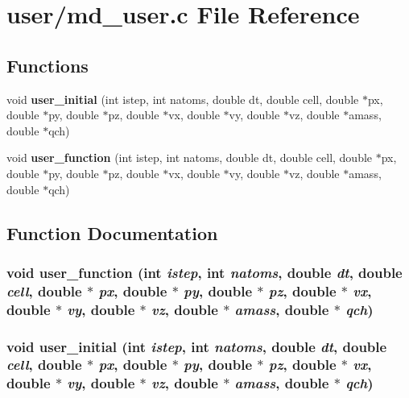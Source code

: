 \section{user/md\_\-user.c File Reference}
\label{md__user_8c}
\subsection*{Functions}
\begin{CompactItemize}
\item 
void {\bf user\_\-initial} (int istep, int natoms, double dt, double cell, double $\ast$px, double $\ast$py, double $\ast$pz, double $\ast$vx, double $\ast$vy, double $\ast$vz, double $\ast$amass, double $\ast$qch)
\item 
void {\bf user\_\-function} (int istep, int natoms, double dt, double cell, double $\ast$px, double $\ast$py, double $\ast$pz, double $\ast$vx, double $\ast$vy, double $\ast$vz, double $\ast$amass, double $\ast$qch)
\end{CompactItemize}


\subsection{Function Documentation}
\subsubsection{\setlength{\rightskip}{0pt plus 5cm}void user\_\-function (int {\em istep}, int {\em natoms}, double {\em dt}, double {\em cell}, double $\ast$ {\em px}, double $\ast$ {\em py}, double $\ast$ {\em pz}, double $\ast$ {\em vx}, double $\ast$ {\em vy}, double $\ast$ {\em vz}, double $\ast$ {\em amass}, double $\ast$ {\em qch})}\label{md__user_8c_a4b4891d9222ff15027095a6acb4e276}


\subsubsection{\setlength{\rightskip}{0pt plus 5cm}void user\_\-initial (int {\em istep}, int {\em natoms}, double {\em dt}, double {\em cell}, double $\ast$ {\em px}, double $\ast$ {\em py}, double $\ast$ {\em pz}, double $\ast$ {\em vx}, double $\ast$ {\em vy}, double $\ast$ {\em vz}, double $\ast$ {\em amass}, double $\ast$ {\em qch})}\label{md__user_8c_f95e44ac18957a866ac0e83c03058260}


